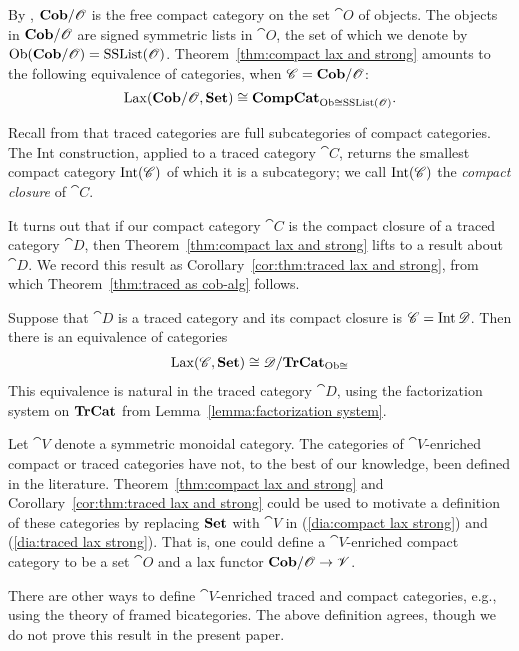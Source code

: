 \documentclass[12pt,oneside,article,draft]{memoir}
\begin{document}
By \cite{Abramsky}, $\mathbf{Cob}/\mathscr{O}$ is the free compact category on the set $\cat{O}$ of objects. The objects in $\mathbf{Cob}/\mathscr{O}$ are  signed symmetric lists in $\cat{O}$, the set of which we denote by $\operatorname{Ob}(\mathbf{Cob}/\mathscr{O})=\textnormal{SSList}(\mathscr{O})$. Theorem~\ref{thm:compact lax and strong} amounts to the following equivalence of categories, when $\mathscr{C}=\mathbf{Cob}/\mathscr{O}$:
$$\operatorname{Lax}(\mathbf{Cob}/\mathscr{O},\mathbf{Set})\cong\mathbf{CompCat}_{{\operatorname{Ob}\cong}\textnormal{SSList}(\mathscr{O})}.$$

Recall from \cite{JoyalStreetVerity} that traced categories are full subcategories of compact categories. The Int construction, applied to a traced category $\cat{C}$, returns the smallest compact category $\operatorname{Int}(\mathscr{C})$ of which it is a subcategory; we call $\operatorname{Int}(\mathscr{C})$ the \emph{compact closure} of $\cat{C}$. 

It turns out that if our compact category $\cat{C}$ is the compact closure of a traced category $\cat{D}$, then Theorem~\ref{thm:compact lax and strong} lifts to a result about $\cat{D}$. We record this result as Corollary~\ref{cor:thm:traced lax and strong}, from which Theorem~\ref{thm:traced as cob-alg} follows. 

\begin{corollary}\label{cor:thm:traced lax and strong}
Suppose that $\cat{D}$ is a traced category and its compact closure is $\mathscr{C}=\operatorname{Int}\mathscr{D}$. Then there is an equivalence of categories
\begin{align}\label{dia:traced lax strong}
\operatorname{Lax}(\mathscr{C},\mathbf{Set})\cong\mathscr{D}/\mathbf{TrCat}_{{\operatorname{Ob}\cong}}
\end{align}
This equivalence is natural in the traced category $\cat{D}$, using the factorization system on $\mathbf{TrCat}$ from Lemma~\ref{lemma:factorization system}.
\end{corollary}

\begin{remark}

Let $\cat{V}$ denote a symmetric monoidal category. The categories of $\cat{V}$-enriched compact or traced categories have not, to the best of our knowledge, been defined in the literature. Theorem~\ref{thm:compact lax and strong} and Corollary~\ref{cor:thm:traced lax and strong} could be used to motivate a definition of these categories by replacing $\mathbf{Set}$ with $\cat{V}$ in (\ref{dia:compact lax strong}) and (\ref{dia:traced lax strong}). That is, one could define a $\cat{V}$-enriched compact category to be a set $\cat{O}$ and a lax functor $\mathbf{Cob}/\mathscr{O}\to\mathscr{V}$. 

There are other ways to define $\cat{V}$-enriched traced and compact categories, e.g., using the theory of framed bicategories. The above definition agrees, though we do not prove this result in the present paper.

\end{remark}
\end{document}

